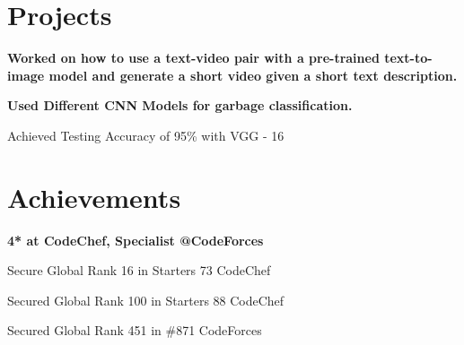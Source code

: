 \documentclass[]{deedy-resume-openfont}
\begin{document}
\begin{minipage}[t]{0.66\textwidth} 


\section{Projects \\}
\vspace{\topsep} %
\begin{tightemize}
\item \bf Worked on how to use a text-video pair with a pre-trained text-to-image model and generate a short video given a short text description.
\end{tightemize}
\sectionsep

\vspace{\topsep} %
\begin{tightemize}
\item \bf Used Different CNN Models for garbage classification.
\item Achieved Testing Accuracy of 95\% with VGG - 16
\end{tightemize}
\sectionsep


\section{Achievements}
\vspace{\topsep} %
\begin{tightemize}
\item \bf 4* at CodeChef, \hspace{0.05cm} Specialist @CodeForces
\item Secure Global Rank 16 in Starters 73 CodeChef
\item Secured Global Rank 100 in Starters 88 CodeChef
\item Secured Global Rank 451 in \#871 CodeForces
\end{tightemize}
\sectionsep



\end{minipage}
\end{document}
